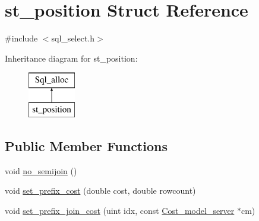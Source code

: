 \hypertarget{structst__position}{}\section{st\+\_\+position Struct Reference}
\label{structst__position}


{\ttfamily \#include $<$sql\+\_\+select.\+h$>$}

Inheritance diagram for st\+\_\+position\+:\begin{figure}[H]
\begin{center}
\leavevmode
\includegraphics[height=2.000000cm]{structst__position}
\end{center}
\end{figure}
\subsection*{Public Member Functions}
\begin{DoxyCompactItemize}
\item 
void \mbox{\hyperlink{structst__position_a2ebb88c3230d471f89bda02de12f62e6}{no\+\_\+semijoin}} ()
\item 
void \mbox{\hyperlink{structst__position_aa317ac2b3fa373e6c8f9a1a02c2e2754}{set\+\_\+prefix\+\_\+cost}} (double cost, double rowcount)
\item 
void \mbox{\hyperlink{structst__position_a3077a39535d27d819e8e027e22905840}{set\+\_\+prefix\+\_\+join\+\_\+cost}} (uint idx, const \mbox{\hyperlink{classCost__model__server}{Cost\+\_\+model\+\_\+server}} $\ast$cm)
\end{DoxyCompactItemize}
